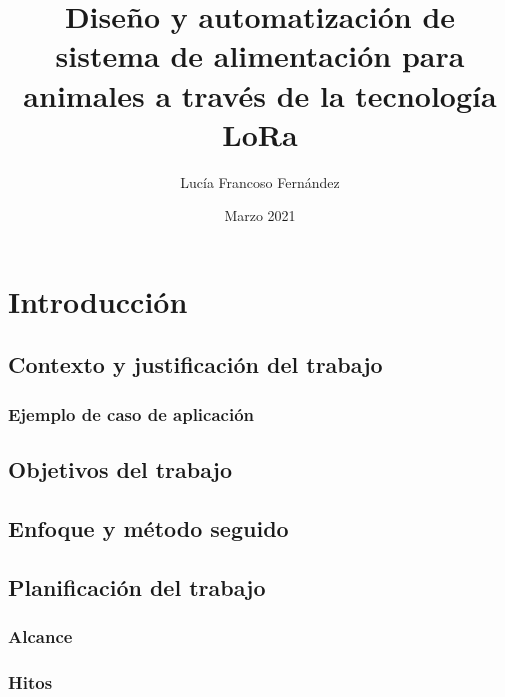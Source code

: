 \documentclass[12pt]{article}
\begin{document}
	\title{Diseño y automatización de sistema de alimentación para animales a través de la tecnología LoRa}
	\author{Lucía Francoso Fernández}
	\date{Marzo 2021}
	
	\maketitle
	\pagebreak
	
	\tableofcontents
	
	\pagebreak

	\listoffigures

	\listoftables
	
	\section[Introducción]{Introducción} %
	
	\subsection[Contexto y justificación del trabajo]{Contexto y justificación del trabajo}
	\subsubsection[Ejemplo de caso de aplicación]{Ejemplo de caso de aplicación}
	\subsection[Objetivos del trabajo]{Objetivos del trabajo}
	\subsection[Enfoque y método seguido]{Enfoque y método seguido}
	\subsection[Planificación del trabajo]{Planificación del trabajo}
	\subsubsection[Alcance]{Alcance}
	\subsubsection[Hitos]{Hitos}	
\end{document}
